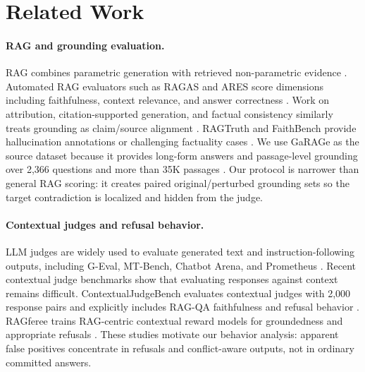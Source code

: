 \section{Related Work}

\paragraph{RAG and grounding evaluation.}
RAG combines parametric generation with retrieved non-parametric evidence \citep{lewis2020rag}. Automated RAG evaluators such as RAGAS and ARES score dimensions including faithfulness, context relevance, and answer correctness \citep{es2023ragas,saadfalcon2023ares}. Work on attribution, citation-supported generation, and factual consistency similarly treats grounding as claim/source alignment \citep{rashkin2023attribution,gao2023alce,honovich2022true,min2023factscore}. RAGTruth and FaithBench provide hallucination annotations or challenging factuality cases \citep{niu2023ragtruth,bao2024faithbench}. We use GaRAGe as the source dataset because it provides long-form answers and passage-level grounding over 2,366 questions and more than 35K passages \citep{sorodoc2025garage}. Our protocol is narrower than general RAG scoring: it creates paired original/perturbed grounding sets so the target contradiction is localized and hidden from the judge.

\paragraph{Contextual judges and refusal behavior.}
LLM judges are widely used to evaluate generated text and instruction-following outputs, including G-Eval, MT-Bench, Chatbot Arena, and Prometheus \citep{liu2023geval,zheng2023judging,kim2023prometheus}. Recent contextual judge benchmarks show that evaluating responses against context remains difficult. ContextualJudgeBench evaluates contextual judges with 2,000 response pairs and explicitly includes RAG-QA faithfulness and refusal behavior \citep{xu2025contextualjudgebench}. RAGferee trains RAG-centric contextual reward models for groundedness and appropriate refusals \citep{coman2025ragferee}. These studies motivate our behavior analysis: apparent false positives concentrate in refusals and conflict-aware outputs, not in ordinary committed answers.

